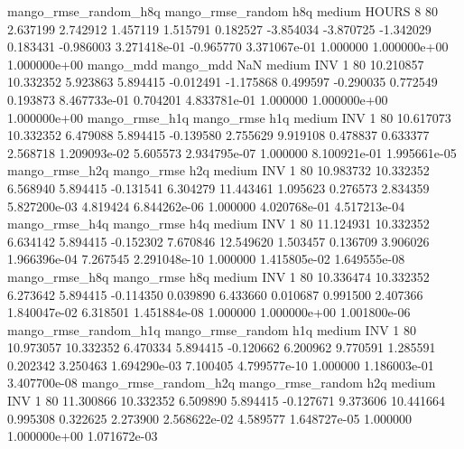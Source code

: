 mango_rmse_random_h8q mango_rmse_random                  h8q     medium    HOURS                 8 80  2.637199       2.742912 1.457119       1.515791    0.182527     -3.854034     -3.870725    -1.342029       0.183431 -0.986003 3.271418e-01    -0.965770   3.371067e-01            1.000000    1.000000e+00        1.000000e+00
            mango_mdd         mango_mdd                  NaN     medium      INV                 1 80 10.210857      10.332352 5.923863       5.894415   -0.012491     -1.175868      0.499597    -0.290035       0.772549  0.193873 8.467733e-01     0.704201   4.833781e-01            1.000000    1.000000e+00        1.000000e+00
       mango_rmse_h1q        mango_rmse                  h1q     medium      INV                 1 80 10.617073      10.332352 6.479088       5.894415   -0.139580      2.755629      9.919108     0.478837       0.633377  2.568718 1.209093e-02     5.605573   2.934795e-07            1.000000    8.100921e-01        1.995661e-05
       mango_rmse_h2q        mango_rmse                  h2q     medium      INV                 1 80 10.983732      10.332352 6.568940       5.894415   -0.131541      6.304279     11.443461     1.095623       0.276573  2.834359 5.827200e-03     4.819424   6.844262e-06            1.000000    4.020768e-01        4.517213e-04
       mango_rmse_h4q        mango_rmse                  h4q     medium      INV                 1 80 11.124931      10.332352 6.634142       5.894415   -0.152302      7.670846     12.549620     1.503457       0.136709  3.906026 1.966396e-04     7.267545   2.291048e-10            1.000000    1.415805e-02        1.649555e-08
       mango_rmse_h8q        mango_rmse                  h8q     medium      INV                 1 80 10.336474      10.332352 6.273642       5.894415   -0.114350      0.039890      6.433660     0.010687       0.991500  2.407366 1.840047e-02     6.318501   1.451884e-08            1.000000    1.000000e+00        1.001800e-06
mango_rmse_random_h1q mango_rmse_random                  h1q     medium      INV                 1 80 10.973057      10.332352 6.470334       5.894415   -0.120662      6.200962      9.770591     1.285591       0.202342  3.250463 1.694290e-03     7.100405   4.799577e-10            1.000000    1.186003e-01        3.407700e-08
mango_rmse_random_h2q mango_rmse_random                  h2q     medium      INV                 1 80 11.300866      10.332352 6.509890       5.894415   -0.127671      9.373606     10.441664     0.995308       0.322625  2.273900 2.568622e-02     4.589577   1.648727e-05            1.000000    1.000000e+00        1.071672e-03
